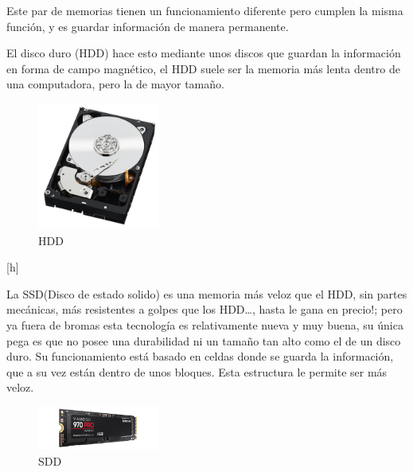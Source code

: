 \documentclass{article}
\begin{document}
Este par de memorias tienen un funcionamiento diferente pero cumplen la misma función, y es guardar información de manera permanente.
\vspace{0.4cm}


El disco duro (HDD) hace esto mediante unos discos que guardan la información en forma de campo magnético, el HDD suele ser la memoria más lenta dentro de una computadora, pero la de mayor tamaño.\cite{ssd}
\vspace{0.4cm}

\begin{figure}
    \centering
    \includegraphics[width=4cm]{HDD.png}
    \caption{HDD}
    \label{fig:my_label}
\end{figure}[h]


La SSD(Disco de estado solido) es una memoria más veloz que el HDD, sin partes mecánicas, más resistentes a golpes que los HDD…, hasta le gana en precio!; pero ya fuera de bromas esta tecnología es relativamente nueva y muy buena, su única pega es que no posee una durabilidad ni un tamaño tan alto como el de un disco duro. Su funcionamiento está basado en celdas donde se guarda la información, que a su vez están dentro de unos bloques. Esta estructura le permite ser más veloz.\cite{disco}

\begin{figure}
    \centering
    \includegraphics[width=4cm]{SSD.jpg}
    \caption{SDD}
    \label{fig:my_label}
\end{figure}
\end{document}
